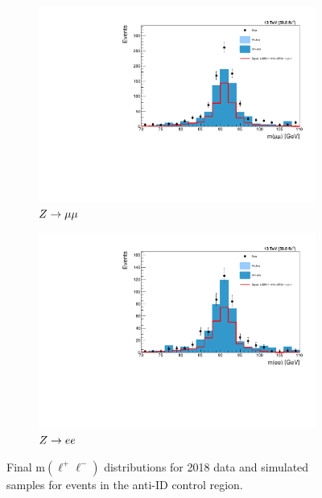 \begin{figure}[htb!]
	\centering
	\captionsetup[subfigure]{justification=centering}
	\begin{subfigure}[h]{0.45\linewidth}
		\centering
		\includegraphics[width=\linewidth]{figs/05_analysis/2018_ZX_Z_mass_MU_final_med.pdf}
		\caption{$Z\to\mu\mu$}
	\end{subfigure}
	\begin{subfigure}[h]{0.45\linewidth}
		\centering
		\includegraphics[width=\linewidth]{figs/05_analysis/2018_ZX_Z_mass_ELE_final_med.pdf}
		\caption{$Z\to ee$}
	\end{subfigure}
	\caption[Final m$\left(\ell^+\ell^-\right)$ distributions for 2018 data and simulated samples for events in the anti-ID control region.]{Final m$\left(\ell^+\ell^-\right)$ distributions for 2018 data and simulated samples for events in the anti-ID control region.}
	\label{fig:zmass2018_final_med}
\end{figure}

